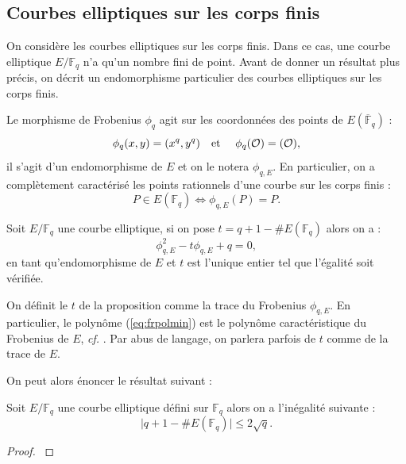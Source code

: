 \documentclass[a4paper]{article} %
\numberwithin{section}{part}
\numberwithin{equation}{section}
\newcommand\GF[1]{\mathbb{F}_{#1}}
\newcommand\EO{\mathcal{O}}
\newcommand\etmath{\textup{\quad et \quad}}
\begin{document}
\subsection{Courbes elliptiques sur les corps finis}
\label{sec:curvff}
On considère les courbes elliptiques sur les corps finis. Dans ce cas, une 
courbe elliptique $E/\GF{q}$ n'a qu'un nombre fini de point. Avant de donner un
résultat plus précis, on décrit un endomorphisme particulier des courbes 
elliptiques sur les corps finis.\par
Le morphisme de Frobenius $\phi_q$ agit sur les coordonnées des points de
$E(\overline{\mathbb{F}}_q)$ :
\begin{equation}
\phi_q(x,y) = (x^q, y^q)\etmath \phi_q(\EO) = (\EO),
\end{equation}
il s'agit d'un endomorphisme de $E$ et on le notera $\phi_{q,E}$. 
En particulier, on a complètement caractérisé les points rationnels d'une courbe
sur les corps finis :
\begin{equation}
P\in E(\GF{q}) \Leftrightarrow \phi_{q,E}(P) = P.
\end{equation}
\begin{prop}
Soit $E/\GF{q}$ une courbe elliptique, si on pose $t = q + 1 - \#E(\GF{q})$
alors on a :
\begin{equation}
\label{eq:frpolmin}
\phi_{q,E}^2 - t\phi_{q,E} + q = 0,
\end{equation}
en tant qu'endomorphisme de $E$ et $t$ est l'unique entier tel que l'égalité
soit vérifiée.
\end{prop}
On définit le $t$ de la proposition comme la trace du Frobenius $\phi_{q,E}$. 
En particulier, le polynôme (\ref{eq:frpolmin}) est le polynôme caractéristique 
du Frobenius de $E$, \emph{cf.} \cite[Chap. V, th. 2.3.1]{Sil}. Par abus de 
langage, on parlera parfois de $t$ comme de la trace de $E$.\par
On peut alors énoncer le résultat suivant :
\begin{thm}[Hasse]
\label{th:hasse}
Soit $E/\GF{q}$ une courbe elliptique défini sur $\GF{q}$ alors on a l'inégalité
suivante :
\begin{equation}
\vert{q + 1 - \#E(\GF{q})}\vert\leq 2\sqrt{q}.
\end{equation}
\end{thm}
\begin{proof}
\cite[Chap. V, th. 1.1]{Sil}
\end{proof}
\end{document}
